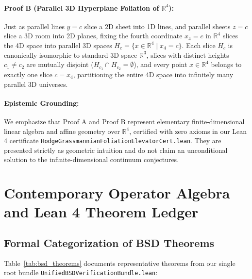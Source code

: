 \documentclass[11pt,a4paper]{article}
\theoremstyle{definition}
\begin{document}
\paragraph{Proof B (Parallel 3D Hyperplane Foliation of $\mathbb{R}^4$):}
Just as parallel lines $y = c$ slice a 2D sheet into 1D lines, and parallel sheets $z = c$ slice a 3D room into 2D planes, fixing the fourth coordinate $x_4 = c$ in $\mathbb{R}^4$ slices the 4D space into parallel 3D spaces $H_c = \{x \in \mathbb{R}^4 \mid x_4 = c\}$. Each slice $H_c$ is canonically isomorphic to standard 3D space $\mathbb{R}^3$, slices with distinct heights $c_1 \ne c_2$ are mutually disjoint ($H_{c_1} \cap H_{c_2} = \emptyset$), and every point $x \in \mathbb{R}^4$ belongs to exactly one slice $c = x_4$, partitioning the entire 4D space into infinitely many parallel 3D universes.

\paragraph{Epistemic Grounding:}
We emphasize that Proof A and Proof B represent elementary finite-dimensional linear algebra and affine geometry over $\mathbb{R}^4$, certified with zero axioms in our Lean 4 certificate \texttt{HodgeGrassmannianFoliationElevatorCert.lean}. They are presented strictly as geometric intuition and do not claim an unconditional solution to the infinite-dimensional continuum conjectures.

\section{Contemporary Operator Algebra and Lean 4 Theorem Ledger}

\subsection{Formal Categorization of BSD Theorems}
Table~\ref{tab:bsd_theorems} documents representative theorems from our single root bundle \texttt{UnifiedBSDVerificationBundle.lean}:
\end{document}
